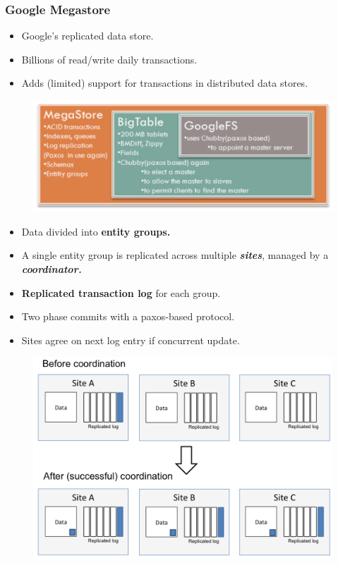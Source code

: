 \documentclass{beamer}
\begin{document}
\begin{frame}
    \frametitle{Google Megastore}
    \begin{itemize}
        \item Google's replicated data store.
        \item Billions  of read/write daily transactions.
        \item Adds (limited) support for transactions  in distributed data stores.   
    \end{itemize}
    \begin{figure}
        \includegraphics[width=\textwidth]{img/megastore.png}
    \end{figure}
\end{frame}
\begin{frame}
    \begin{itemize}
        \item Data divided into \textbf{entity groups.} 
        \item A single entity group is replicated across multiple \textbf{\emph{sites}}, managed by a \emph{\textbf{coordinator.}}
        \item \textbf{Replicated transaction log}  for each group.
        \item Two phase commits with a paxos-based protocol.
        \item Sites agree on next log entry if concurrent update.
    \end{itemize}
    \begin{figure}
        \includegraphics[width=\textwidth, height=.6\textheight,keepaspectratio]{img/paxos.png}
    \end{figure}
\end{frame}
\end{document}
